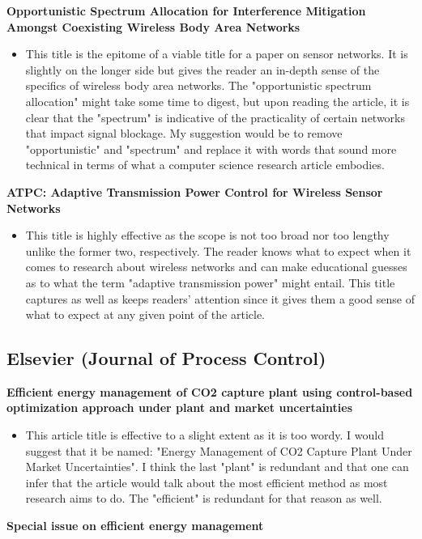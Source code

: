 \documentclass[11pt,twocolumn]{article}
\begin{document}
\begin{itemize}
{{\bf{
Opportunistic Spectrum Allocation for Interference Mitigation Amongst Coexisting Wireless Body Area Networks}}
\begin{itemize}
\item This title is the epitome of a viable title for a paper on sensor networks. It is slightly on the longer side but gives the reader an in-depth sense of the specifics of wireless body area networks. The "opportunistic spectrum allocation" might take some time to digest, but upon reading the article, it is clear that the "spectrum" is indicative of the practicality of certain networks that impact signal blockage. My suggestion would be to remove "opportunistic" and "spectrum" and replace it with words that sound more technical in terms of what a computer science research article embodies.
\end{itemize}


{\bf{ATPC: Adaptive Transmission Power Control for Wireless Sensor Networks}}
\begin{itemize}
\item This title is highly effective as the scope is not too broad nor too lengthy unlike the former two, respectively. The reader knows what to expect when it comes to research about wireless networks and can make educational guesses as to what the term "adaptive transmission power" might entail. This title captures as well as keeps readers' attention since it gives them a good sense of what to expect at any given point of the article. 
\end{itemize}

\subsection{Elsevier (Journal of Process Control)}

{\bf{Efficient energy management of CO2 capture plant using control-based optimization approach under plant and market uncertainties}}
\begin{itemize}
    \item This article title is effective to a slight extent as it is too wordy. I would suggest that it be named: "Energy Management of CO2 Capture Plant Under Market Uncertainties". I think the last "plant" is redundant and that one can infer that the article would talk about the most efficient method as most research aims to do. The "efficient" is redundant for that reason as well.   
\end{itemize}
{\bf{Special issue on efficient energy management}}

}
\end{itemize}
\end{document}
